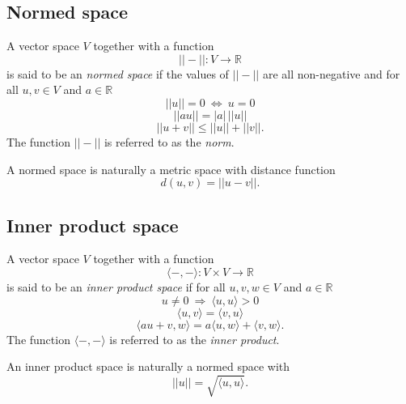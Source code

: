 \documentclass{amsart}
\begin{document}
	\subsection*{Normed space} \label{normed_space}
	A vector space $V$ together with a function	
	\begin{equation*}	
	||-|| : V \to \mathbb R	
	\end{equation*}	
	is said to be an \textit{normed space} if the values of $||-||$ are all non-negative and for all $u,v \in V$ and $a \in \mathbb R$	
	\begin{equation*}	
	||u|| = 0\ \Leftrightarrow\ u = 0
	\end{equation*}	
	\begin{equation*}	
	||a u || = |a|\, ||u||	
	\end{equation*}	
	\begin{equation*}	
	||u + v|| \leq ||u|| + ||v||.
	\end{equation*}	
	The function $||-||$ is referred to as the \textit{norm}.
	
	A normed space is naturally a
	metric space with distance function	
	\begin{equation*}	
	d(u,v) = ||u-v||.	
	\end{equation*}
	
	\subsection*{Inner product space} \label{inner_product_space}	
	
	A vector space $V$ together with a function
	\begin{equation*}	
	\langle -, - \rangle : V \times V \to \mathbb R	
	\end{equation*}
	is said to be an \textit{inner product space} if for all $u,v,w \in V$ and $a \in \mathbb R$
	\begin{equation*}	
	u \neq 0\ \Rightarrow\ \langle u, u \rangle > 0 	
	\end{equation*}	
	\begin{equation*}	
	\langle u, v\rangle = \langle v, u\rangle	
	\end{equation*}
	\begin{equation*}
	\langle au+v, w \rangle = a\langle u, w \rangle + \langle v, w \rangle.	
	\end{equation*}	
	The function $\langle -, - \rangle$ is referred to as the \textit{inner product}.
	
	An inner product space is naturally a normed space with	
	\begin{equation*}	
	||u|| = \sqrt{\langle u, u \rangle}.
	\end{equation*}
	
\end{document}
